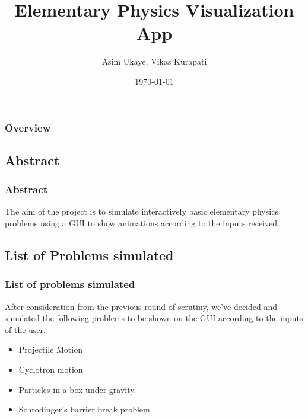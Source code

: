 \documentclass{beamer}
\title[Physics Simulator]{Elementary Physics Visualization App} %
\author{Asim Ukaye, Vikas Kurapati} %
\institute[IITB] %
{
Department of Aerospace Engineering \\ %
\medskip
Indian Institute of Technology, Bombay %
}
\date{\today} %
\begin{document}
\begin{frame}
\titlepage %
\end{frame}

\begin{frame}
\frametitle{Overview} %
\tableofcontents %
\end{frame}

\begin{frame}
\section{Abstract}
\frametitle{Abstract}
The aim of the project is to simulate interactively basic elementary physics problems using a GUI to show animations according to the inputs received.
\end{frame}


\begin{frame}
\section{List of Problems simulated}
\frametitle{List of problems simulated}
After consideration from the previous round of scrutiny, we've decided and simulated the following problems to be shown on the GUI according to the inputs of the user.
\begin{itemize}
\item Projectile Motion
\item Cyclotron motion
\item Particles in a box under gravity.
\item Schrodinger's barrier break problem
\end{itemize}
\end{frame}
\end{document}
